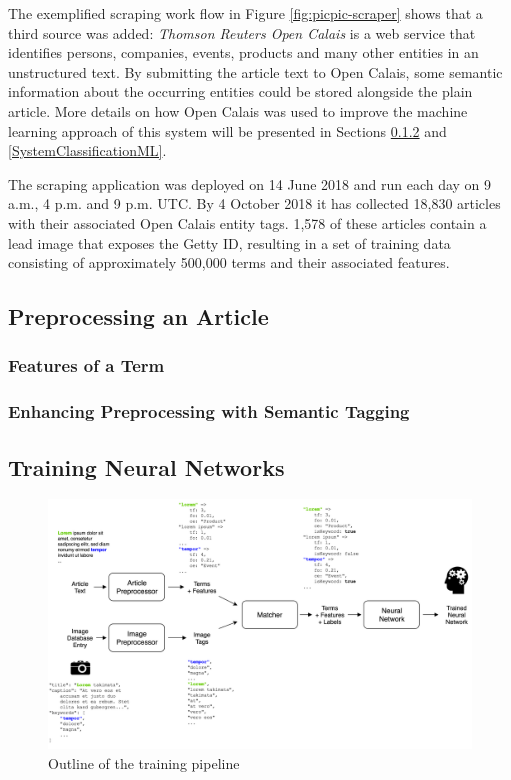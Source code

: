 \documentclass[11pt,a4paper,twoside]{article}
\begin{document}
The exemplified scraping work flow in Figure \ref{fig:picpic-scraper} shows that a third source was added: \emph{Thomson Reuters Open Calais} \cite{ThomsonReutersOpenCalais} is a web service that identifies persons, companies, events, products and many other entities in an unstructured text. By submitting the article text to Open Calais, some semantic information about the occurring entities could be stored alongside the plain article. More details on how Open Calais was used to improve the machine learning approach of this system will be presented in Sections \ref{SystemPreprocessCalais} and \ref{SystemClassificationML}.

The scraping application was deployed on 14 June 2018 and run each day on 9 a.m., 4 p.m. and 9 p.m. UTC. By 4 October 2018 it has collected 18,830 articles with their associated Open Calais entity tags. 1,578 of these articles contain a lead image that exposes the Getty ID, resulting in a set of training data consisting of approximately 500,000 terms and their associated features.

\subsection{Preprocessing an Article} \label{SystemPreprocess}
\subsubsection{Features of a Term} \label{SystemPreprocessFeatures}
\subsubsection{Enhancing Preprocessing with Semantic Tagging} \label{SystemPreprocessCalais}

\subsection{Training Neural Networks} \label{SystemTrain}

\begin{figure}[t]
  \includegraphics[width=\columnwidth]{picpic-training.png}
  \caption{Outline of the training pipeline}
  \label{fig:picpic-training}
\end{figure}
\end{document}
